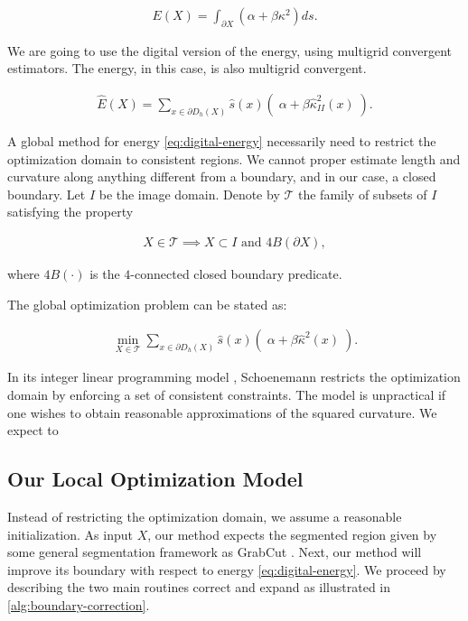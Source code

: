 \documentclass[runningheads]{llncs}
\begin{document}
\begin{align*}
	E(X) = \int_{\partial X}{(\alpha + \beta \kappa^2) ds}.
\end{align*}

We are going to use the digital version of the energy, using multigrid convergent estimators. The energy, in this case, is also multigrid convergent.

\begin{align}
	\hat{E}(X) = \sum_{x \in \partial D_h(X)}{ \hat{s}(x)\left(\; \alpha + \beta \hat{\kappa}_{II}^2(x) \; \right)}.  
	\label{eq:digital-energy}
\end{align}

A global method for energy \eqref{eq:digital-energy} necessarily need to restrict the optimization domain to consistent regions. We cannot proper estimate length and curvature along anything different from a boundary, and in our case, a closed boundary. Let $I$ be the image domain. Denote by $\mathcal{T}$ the family of subsets of $I$ satisfying the property

\begin{align*}
	X \in \mathcal{T} \implies X \subset I \text{ and } 4B(\partial X),
\end{align*} 

where $4B(\cdot)$ is the $4$-connected closed boundary predicate. 


The global optimization problem can be stated as:

\begin{align*}
	\min_{X \in \mathcal{T}}{\sum_{x \in \partial D_h(X)}{ \hat{s}(x)\left(\; \alpha + \beta \hat{\kappa}^2(x) \; \right)}.}
\end{align*}

In its integer linear programming model \cite{schoenemann09}, Schoenemann restricts the optimization domain by enforcing a set of consistent constraints. The model is unpractical if one wishes to obtain reasonable approximations of the squared curvature. We expect to 

\subsection{Our Local Optimization Model}


Instead of restricting the optimization domain, we assume a reasonable initialization. As input $X$, our method expects the segmented region given by some general segmentation framework as GrabCut \cite{rother04}. Next, our method will improve its boundary with respect to energy \eqref{eq:digital-energy}. We proceed by describing the two main routines correct and expand as illustrated in \ref{alg:boundary-correction}.
\end{document}
